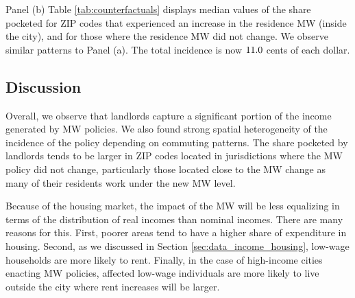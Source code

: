 Panel (b) Table \ref{tab:counterfactuals} displays median values of the
share pocketed for ZIP codes that experienced an increase in the residence MW 
(inside the city), and for those where the residence MW did not change.
We observe similar patterns to Panel (a).
The total incidence is now $\textnormal{11.0}$ cents of each dollar.

\subsection{Discussion}\label{sec:discussion_cf}

Overall, we observe that landlords capture a significant portion of the income 
generated by MW policies.
We also found strong spatial heterogeneity of the incidence of the policy 
depending on commuting patterns.
The share pocketed by landlords tends to be larger in ZIP codes located in 
jurisdictions where the MW policy did not change,
particularly those located close to the MW change as many of their residents
work under the new MW level.

Because of the housing market, 
the impact of the MW will be less equalizing in terms of the distribution of
real incomes than nominal incomes.
There are many reasons for this.
First, poorer areas tend to have a higher share of expenditure in housing.
Second, as we discussed in Section \ref{sec:data_income_housing},
low-wage households are more likely to rent.
Finally, in the case of high-income cities enacting MW policies, affected 
low-wage individuals are more likely to live outside the city where rent
increases will be larger.
